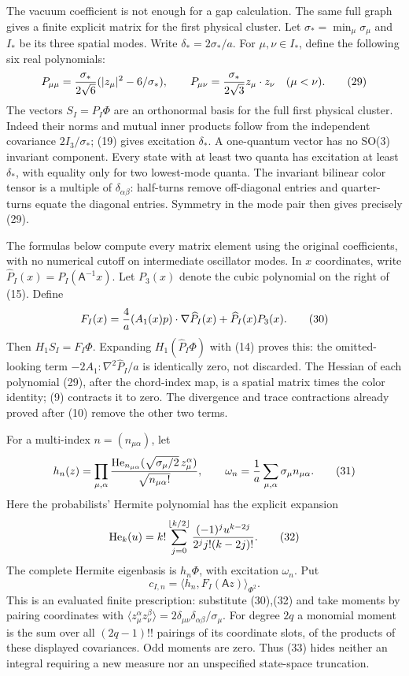 \documentclass[
  11pt,
]{article}
\begin{document}
The vacuum coefficient is not enough for a gap calculation. The same
full graph gives a finite explicit matrix for the first physical
cluster. Let \(\sigma_*=\min_\mu\sigma_\mu\) and \(I_*\) be its three
spatial modes. Write \(\delta_*=2\sigma_*/a\). For \(\mu,\nu\in I_*\),
define the following six real polynomials: \[
 P_{\mu\mu}={\sigma_*\over2\sqrt6}
                 (|z_\mu|^2-6/\sigma_*),\qquad
 P_{\mu\nu}={\sigma_*\over2\sqrt3}z_\mu\cdot z_\nu\quad(\mu<\nu).
 \tag{29}
\] The vectors \(S_I=P_I\Phi\) are an orthonormal basis for the full
first physical cluster. Indeed their norms and mutual inner products
follow from the independent covariance \(2I_3/\sigma_*\); (19) gives
excitation \(\delta_*\). A one-quantum vector has no SO(3) invariant
component. Every state with at least two quanta has excitation at least
\(\delta_*\), with equality only for two lowest-mode quanta. The
invariant bilinear color tensor is a multiple of
\(\delta_{\alpha\beta}\): half-turns remove off-diagonal entries and
quarter-turns equate the diagonal entries. Symmetry in the mode pair
then gives precisely (29).

The formulas below compute every matrix element using the original
coefficients, with no numerical cutoff on intermediate oscillator modes.
In \(x\) coordinates, write \(\widehat P_I(x)=P_I(\mathsf A^{-1}x)\).
Let \(P_3(x)\) denote the cubic polynomial on the right of (15). Define
\[
 F_I(x)={4\over a}(A_1(x)p)\cdot\nabla\widehat P_I(x)
                                      +\widehat P_I(x)P_3(x).
 \tag{30}
\] Then \(H_1S_I=F_I\Phi\). Expanding \(H_1(\widehat P_I\Phi)\) with
(14) proves this: the omitted-looking term
\(-2A_1:\nabla^2\widehat P_I/a\) is identically zero, not discarded. The
Hessian of each polynomial (29), after the chord-index map, is a spatial
matrix times the color identity; (9) contracts it to zero. The
divergence and trace contractions already proved after (10) remove the
other two terms.

For a multi-index \(n=(n_{\mu\alpha})\), let \[
 h_n(z)=\prod_{\mu,\alpha}
 {\operatorname{He}_{n_{\mu\alpha}}(\sqrt{\sigma_\mu/2}\,
                                          z_\mu^\alpha)
          \over\sqrt{n_{\mu\alpha}!}},\qquad
 \omega_n={1\over a}\sum_{\mu,\alpha}\sigma_\mu n_{\mu\alpha}.
 \tag{31}
\] Here the probabilists' Hermite polynomial has the explicit expansion
\[
 \operatorname{He}_k(u)
 =k!\sum_{j=0}^{\lfloor k/2\rfloor}
                  {(-1)^j u^{k-2j}\over2^j j!(k-2j)!}.
 \tag{32}
\] The complete Hermite eigenbasis is \(h_n\Phi\), with excitation
\(\omega_n\). Put \[
 c_{I,n}=\langle h_n,F_I(\mathsf A z)\rangle_{\Phi^2}.
 \tag{33}
\] This is an evaluated finite prescription: substitute (30),(32) and
take moments by pairing coordinates with
\(\langle z_\mu^\alpha z_\nu^\beta\rangle
=2\delta_{\mu\nu}\delta_{\alpha\beta}/\sigma_\mu\). For degree \(2q\) a
monomial moment is the sum over all \((2q-1)!!\) pairings of its
coordinate slots, of the products of these displayed covariances. Odd
moments are zero. Thus (33) hides neither an integral requiring a new
measure nor an unspecified state-space truncation.
\end{document}
